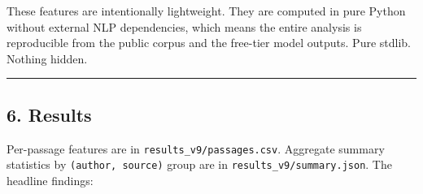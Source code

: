 These features are intentionally lightweight. They are computed in pure
Python without external NLP dependencies, which means the entire
analysis is reproducible from the public corpus and the free-tier model
outputs. Pure stdlib. Nothing hidden.

\begin{center}\rule{0.5\linewidth}{0.5pt}\end{center}

\subsection{6. Results}\label{results}

Per-passage features are in \texttt{results\_v9/passages.csv}. Aggregate
summary statistics by \texttt{(author,\ source)} group are in
\texttt{results\_v9/summary.json}. The headline findings:

